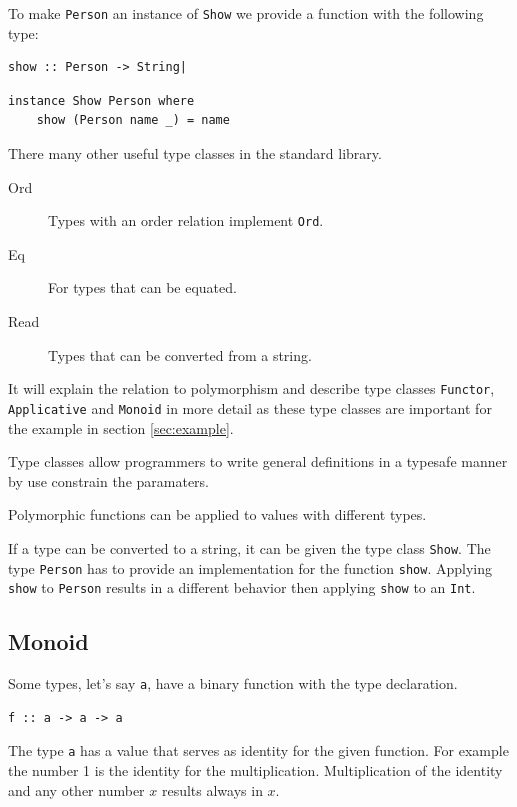 To make \verb|Person| an instance of \verb|Show| we provide a function with the following type:
\begin{verbatim}
show :: Person -> String|
\end{verbatim}

\begin{verbatim}
instance Show Person where
    show (Person name _) = name
\end{verbatim}

There many other useful type classes in the standard library.

\begin{description}
\item[Ord] Types with an order relation implement \verb|Ord|.
\item[Eq] For types that can be equated.
\item[Read] Types that can be converted from a string.
\end{description}

It will explain the relation to polymorphism and describe type classes \verb|Functor|, \verb|Applicative| and \verb|Monoid| in more detail as these type classes are important for the example in section \ref{sec:example}.

Type classes allow programmers to write general definitions in a typesafe manner by use constrain the paramaters.

Polymorphic functions can be applied to values with different types. 

If a type can be converted to a string, it can be given the type class \verb|Show|. The type \verb|Person| has to provide an implementation for the function \verb|show|. Applying \verb|show| to \verb|Person| results in a different behavior then applying \verb|show| to an \verb|Int|.

\subsection{Monoid}

Some types, let's say \verb|a|, have a binary function with the type declaration. 
\begin{verbatim}
f :: a -> a -> a
\end{verbatim}

The type \verb|a| has a value that serves as identity for the given function. For example the number 1 is the identity for the multiplication. Multiplication of the identity and any other number $x$ results always in $x$.


